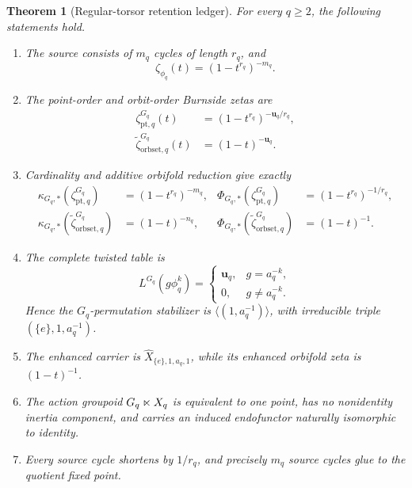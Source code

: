 \documentclass[11pt]{article}
\newtheorem{theorem}{Theorem}[section]
\theoremstyle{definition}
\theoremstyle{remark}
\begin{document}
\begin{theorem}[Regular-torsor retention ledger]
\label{thm:regular-ledger}
For every \(q\ge2\), the following statements hold.
\begin{enumerate}
  \item The source consists of \(m_q\) cycles of length \(r_q\), and
        \begin{equation}
          \zeta_{\phi_q}(t)=(1-t^{r_q})^{-m_q}.
          \label{eq:regular-source-zeta}
        \end{equation}
  \item The point-order and orbit-order Burnside zetas are
        \begin{align}
          \zeta_{\mathrm{pt},q}^{G_q}(t)
          &=(1-t^{r_q})^{-\mathbf u_q/r_q},
          \label{eq:regular-point-zeta}\\
          \widetilde\zeta_{\mathrm{orbset},q}^{G_q}(t)
          &=(1-t)^{-\mathbf u_q}.
          \label{eq:regular-orbit-zeta}
        \end{align}
  \item Cardinality and additive orbifold reduction give exactly
        \begin{align}
          \kappa_{G_q,*}(\zeta_{\mathrm{pt},q}^{G_q})
            &=(1-t^{r_q})^{-m_q},
          &
          \Phi_{G_q,*}(\zeta_{\mathrm{pt},q}^{G_q})
            &=(1-t^{r_q})^{-1/r_q},
          \label{eq:regular-point-reductions}\\
          \kappa_{G_q,*}(\widetilde\zeta_{\mathrm{orbset},q}^{G_q})
            &=(1-t)^{-n_q},
          &
          \Phi_{G_q,*}(\widetilde\zeta_{\mathrm{orbset},q}^{G_q})
            &=(1-t)^{-1}.
          \label{eq:regular-orbit-reductions}
        \end{align}
  \item The complete twisted table is
        \begin{equation}
          L^{G_q}(g\phi_q^k)
          =
          \begin{cases}
            \mathbf u_q,&g=a_q^{-k},\\
            0,&g\ne a_q^{-k}.
          \end{cases}
          \label{eq:twisted-table}
        \end{equation}
        Hence the \(G_q\)-permutation stabilizer is
        \(\langle(1,a_q^{-1})\rangle\), with irreducible triple
        \((\{e\},1,a_q^{-1})\).
  \item The enhanced carrier is
        \(\widehat X_{\{e\},1,a_q,1}\), while its enhanced orbifold zeta is
        \((1-t)^{-1}\).
  \item The action groupoid \(G_q\mathbin{\ltimes} X_q\) is equivalent to one
        point, has no nonidentity inertia component, and carries an induced
        endofunctor naturally isomorphic to identity.
  \item Every source cycle shortens by \(1/r_q\), and precisely \(m_q\)
        source cycles glue to the quotient fixed point.
\end{enumerate}
\end{theorem}
\end{document}
